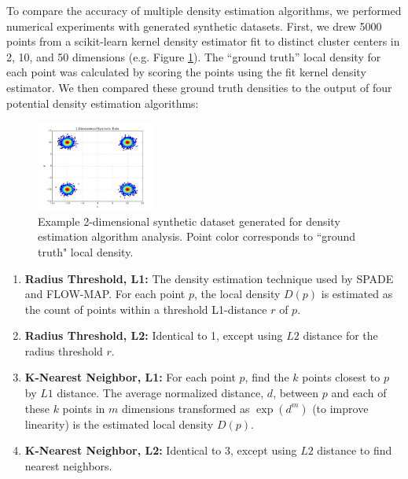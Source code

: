 \documentclass{article}
\begin{document}
To compare the accuracy of multiple density estimation algorithms, we performed numerical experiments with generated synthetic datasets. First, we drew 5000 points from a scikit-learn kernel density estimator \cite{} fit to distinct cluster centers in 2, 10, and 50 dimensions (e.g. Figure \ref{fig:ddd_data_2d}). The “ground truth” local density for each point was calculated by scoring the points using the fit kernel density estimator.  We then compared these ground truth densities to the output of four potential density estimation algorithms:

\begin{figure}
\begin{center}
\includegraphics[width=0.35\textwidth]{Figures/ddd_data_2d.png}
\end{center}
\caption{Example 2-dimensional synthetic dataset generated for density estimation algorithm analysis.  Point color corresponds to ``ground truth" local density.}
\label{fig:ddd_data_2d}
\end{figure}

\begin{enumerate}
\item \textbf{Radius Threshold, L1:} The density estimation technique used by SPADE and FLOW-MAP. For each point $p$, the local density $D(p)$ is estimated as the count of points within a threshold L1-distance $r$ of $p$. 

\item \textbf{Radius Threshold, L2:} Identical to 1, except using $L2$ distance for the radius threshold $r$. 

\item \textbf{K-Nearest Neighbor, L1:} For each point $p$, find the $k$ points closest to $p$ by $L1$ distance.  The average normalized distance, $d$, between $p$ and each of these $k$ points in $m$ dimensions transformed as $\exp(d^m)$ (to improve linearity) is the estimated local density $D(p)$. 

\item \textbf{K-Nearest Neighbor, L2:} Identical to 3, except using $L2$ distance to find nearest neighbors.


\end{enumerate}
\end{document}
